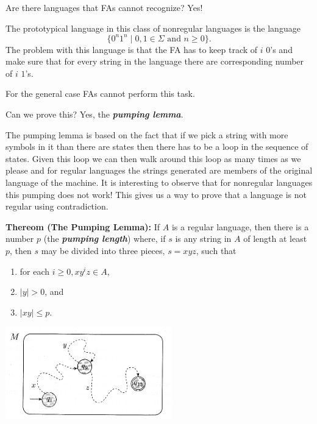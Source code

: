 \documentclass[a4paper,blends,pdf,colorBG,slideColor]{prosper}
\begin{document}
Are there languages that FAs cannot recognize? Yes!

The prototypical 
language in this class of nonregular languages is the language 
\[
\{0^n 1^n  \mid 0,1 \in \Sigma \mbox{ and } n \ge 0 \}.
\]
The problem with this language is that the FA has to keep track of $i$ $0$'s
and make sure that for every  string in the language there are corresponding number
of $i$ $1$'s.

For the general case FAs cannot perform this task.

Can we prove this? Yes, the {\bf \em pumping lemma}.


\es

The pumping lemma is based on the fact that if we pick a string with more symbols in it
than there are states then there has to be a loop in the sequence of states.  
Given this loop we can then walk around this loop as many times as we please
and for regular languages the strings generated are members of the original language
of the machine.  It is interesting to observe that for nonregular languages this
pumping does not work!  This gives us a way to prove that  a language is not
regular using contradiction.
\es



{\bf Thereom (The Pumping Lemma):}  If $A$ is a regular language,
then there is a number $p$ (the {\bf\em pumping length}) where,
if $s$ is any string in $A$ of length at least $p$, then $s$ may be divided into
three pieces, $s = xyz$, such that
\begin{enumerate}
\item for each $i \ge 0, xy^iz \in A$,
\item $\mid y\mid > 0$, and
\item $\mid xy \mid \le p$.
\end{enumerate}
\begin{center}
\includegraphics[height=40mm]{images/nfa-pumping.eps}
\end{center}
\vspace{.2in}
\es
\end{document}
